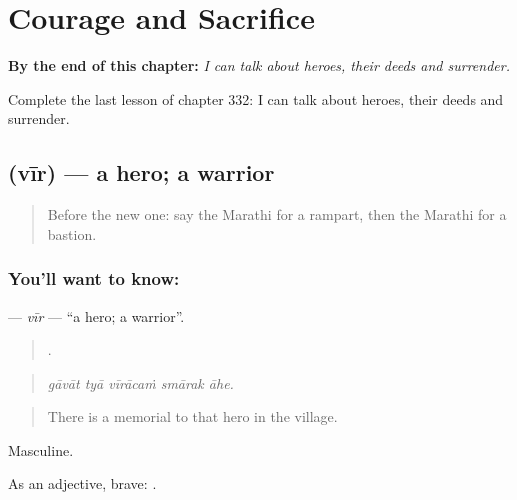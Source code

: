 
\chapter{Courage and Sacrifice}
\label{ch:mr-courage-and-sacrifice}

\begin{chapteropening}
\textbf{By the end of this chapter:} \emph{I can talk about heroes, their deeds and surrender.}

Complete the last lesson of chapter 332: I can talk about heroes, their deeds and surrender.
\end{chapteropening}

\section[\texorpdfstring{\mr{वीर} (vīr)}{वीर (vīr)}]{ (vīr) — a hero; a warrior}

\label{lesson:MR-C332-vir}



\begin{quote}
Before the new one: say the Marathi for a rampart, then the Marathi for a bastion.
\end{quote}

\subsection*{You'll want to know: }
\textbf{} — \emph{vīr} — \textquotedblleft{}a hero; a warrior\textquotedblright{}.

\begin{quote}
    .
\end{quote}

\begin{quote}
\emph{gāvāt tyā vīrācaṁ smārak āhe.}
\end{quote}

\begin{quote}
There is a memorial to that hero in the village.
\end{quote}

Masculine.

As an adjective, brave:  .

